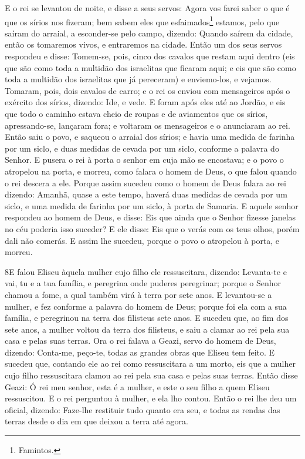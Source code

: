 E o rei se levantou de noite, e disse a seus servos: Agora vos
farei saber o que é que os sírios nos fizeram; bem sabem eles que
esfaimados\footnote{Famintos.} estamos, pelo que saíram do arraial,
a esconder-se pelo campo, dizendo: Quando saírem da cidade, então os
tomaremos vivos, e entraremos na cidade. Então um dos seus
servos respondeu e disse: Tomem-se, pois, cinco dos cavalos que
restam aqui dentro (eis que são como toda a multidão dos israelitas
que ficaram aqui; e eis que são como toda a multidão dos israelitas
que já pereceram) e enviemo-los, e vejamos. Tomaram, pois,
dois cavalos de carro; e o rei os enviou com mensageiros após o
exército dos sírios, dizendo: Ide, e vede. E foram após eles
até ao Jordão, e eis que todo o caminho estava cheio de roupas e de
aviamentos que os sírios, apressando-se, lançaram fora; e voltaram
os mensageiros e o anunciaram ao rei. Então saiu o povo, e
saqueou o arraial dos sírios; e havia uma medida de farinha por um
siclo, e duas medidas de cevada por um siclo, conforme a palavra do
Senhor. E pusera o rei à porta o senhor em cuja mão se
encostava; e o povo o atropelou na porta, e morreu, como falara o
homem de Deus, o que falou quando o rei descera a ele. Porque
assim sucedeu como o homem de Deus falara ao rei dizendo: Amanhã,
quase a este tempo, haverá duas medidas de cevada por um siclo, e
uma medida de farinha por um siclo, à porta de Samaria. E
aquele senhor respondeu ao homem de Deus, e disse: Eis que ainda que
o Senhor fizesse janelas no céu poderia isso suceder? E ele disse:
Eis que o verás com os teus olhos, porém dali não comerás. E
assim lhe sucedeu, porque o povo o atropelou à porta, e morreu.

\medskip

\lettrine{8} E falou Eliseu àquela mulher cujo filho ele
ressuscitara, dizendo: Levanta-te e vai, tu e a tua família, e
peregrina onde puderes peregrinar; porque o Senhor chamou a fome, a
qual também virá à terra por sete anos. E levantou-se a mulher,
e fez conforme a palavra do homem de Deus; porque foi ela com a sua
família, e peregrinou na terra dos filisteus sete anos. E
sucedeu que, ao fim dos sete anos, a mulher voltou da terra dos
filisteus, e saiu a clamar ao rei pela sua casa e pelas suas terras.
Ora o rei falava a Geazi, servo do homem de Deus, dizendo:
Conta-me, peço-te, todas as grandes obras que Eliseu tem feito.
E sucedeu que, contando ele ao rei como ressuscitara a um morto,
eis que a mulher cujo filho ressuscitara clamou ao rei pela sua casa
e pelas suas terras. Então disse Geazi: Ó rei meu senhor, esta é a
mulher, e este o seu filho a quem Eliseu ressuscitou. E o rei
perguntou à mulher, e ela lho contou. Então o rei lhe deu um
oficial, dizendo: Faze-lhe restituir tudo quanto era seu, e todas as
rendas das terras desde o dia em que deixou a terra até agora.


